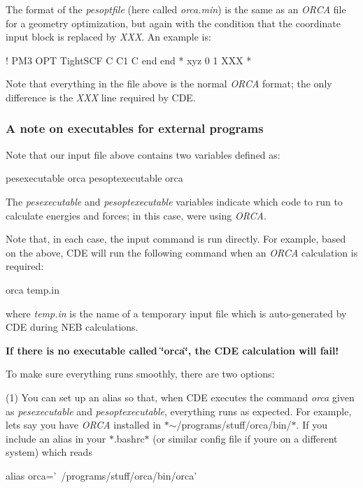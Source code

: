 The format of the {\itshape pesoptfile} (here called {\itshape orca.\+min}) is the same as an {\itshape O\+R\+CA} file for a geometry optimization, but again with the condition that the coordinate input block is replaced by {\itshape X\+XX}. An example is\+: \begin{DoxyVerb}! PM3 OPT TightSCF
     {C C1 C}
   end
 end
* xyz 0 1
XXX
*
\end{DoxyVerb}


Note that everything in the file above is the normal {\itshape O\+R\+CA} format; the only difference is the {\itshape X\+XX} line required by C\+DE.

\subsubsection*{A note on executables for external programs}

Note that our input file above contains two variables defined as\+: \begin{DoxyVerb}  pesexecutable orca
  pesoptexecutable orca
\end{DoxyVerb}


The {\itshape pesexecutable} and {\itshape pesoptexecutable} variables indicate which code to run to calculate energies and forces; in this case, we\textquotesingle{}re using {\itshape O\+R\+CA}.

Note that, in each case, the input command is run directly. For example, based on the above, C\+DE will run the following command when an {\itshape O\+R\+CA} calculation is required\+: \begin{DoxyVerb}orca temp.in
\end{DoxyVerb}


where {\itshape temp.\+in} is the name of a temporary input file which is auto-\/generated by C\+DE during N\+EB calculations.

{\bfseries If there is no executable called \char`\"{}orca\char`\"{}, the C\+DE calculation will fail!}

To make sure everything runs smoothly, there are two options\+:

(1) You can set up an alias so that, when C\+DE executes the command {\itshape orca} given as {\itshape pesexecutable} and {\itshape pesoptexecutable}, everything runs as expected. For example, lets say you have {\itshape O\+R\+CA} installed in $\ast$$\sim$/programs/stuff/orca/bin/$\ast$. If you include an alias in your $\ast$.bashrc$\ast$ (or similar config file if you\textquotesingle{}re on a different system) which reads \begin{DoxyVerb}alias orca='~/programs/stuff/orca/bin/orca'
\end{DoxyVerb}


